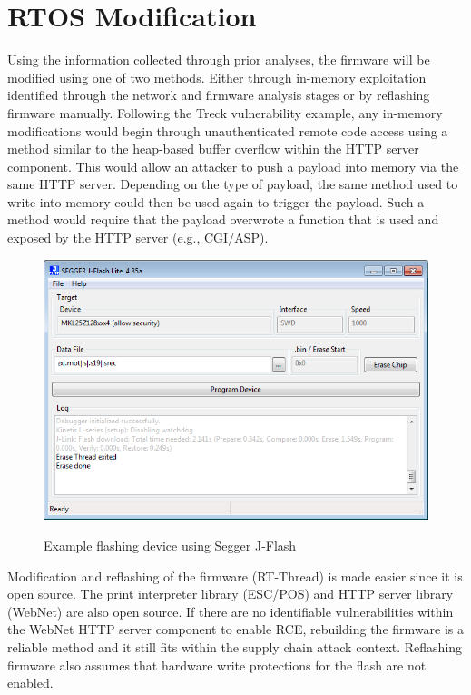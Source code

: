 \section{RTOS Modification} \label{rtosmodification}

Using the information collected through prior analyses, the firmware will be modified using one of two methods. Either through in-memory exploitation identified through the network and firmware analysis stages or by reflashing firmware manually. Following the Treck vulnerability example, any in-memory modifications would begin through unauthenticated remote code access using a method similar to the heap-based buffer overflow within the HTTP server component. This would allow an attacker to push a payload into memory via the same HTTP server. Depending on the type of payload, the same method used to write into memory could then be used again to trigger the payload. Such a method would require that the payload overwrote a function that is used and exposed by the HTTP server (e.g., CGI/ASP).

\begin{figure}[!htb]%
    \centering
    {\includegraphics[width=148mm,scale=0.8]{Figures/j-flash-lite.png}}
    \caption{Example flashing device using Segger J-Flash \autocite{JLinkFlashDownload}}%
    \label{fig:jlink_flash}%
\end{figure}

Modification and reflashing of the firmware (RT-Thread) is made easier since it is open source. The print interpreter library (ESC/POS) and HTTP server library (WebNet) are also open source. If there are no identifiable vulnerabilities within the WebNet HTTP server component to enable RCE, rebuilding the firmware is a reliable method and it still fits within the supply chain attack context. Reflashing firmware also assumes that hardware write protections for the flash are not enabled.
